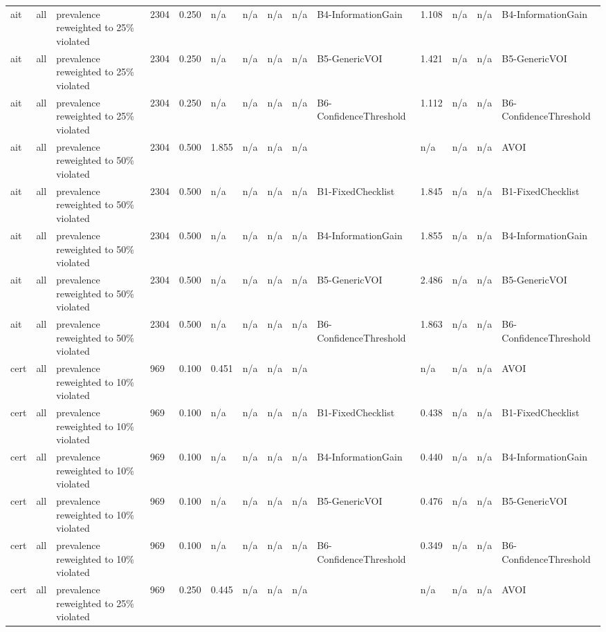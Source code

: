 \begin{table}[!ht]
{\begin{tabular}{llllllllllllll}
ait & all & prevalence reweighted to 25\% violated & 2304 & 0.250 & n/a & n/a & n/a & n/a & B4-InformationGain & 1.108 & n/a & n/a & B4-InformationGain \\
ait & all & prevalence reweighted to 25\% violated & 2304 & 0.250 & n/a & n/a & n/a & n/a & B5-GenericVOI & 1.421 & n/a & n/a & B5-GenericVOI \\
ait & all & prevalence reweighted to 25\% violated & 2304 & 0.250 & n/a & n/a & n/a & n/a & B6-ConfidenceThreshold & 1.112 & n/a & n/a & B6-ConfidenceThreshold \\
ait & all & prevalence reweighted to 50\% violated & 2304 & 0.500 & 1.855 & n/a & n/a & n/a &  & n/a & n/a & n/a & AVOI \\
ait & all & prevalence reweighted to 50\% violated & 2304 & 0.500 & n/a & n/a & n/a & n/a & B1-FixedChecklist & 1.845 & n/a & n/a & B1-FixedChecklist \\
ait & all & prevalence reweighted to 50\% violated & 2304 & 0.500 & n/a & n/a & n/a & n/a & B4-InformationGain & 1.855 & n/a & n/a & B4-InformationGain \\
ait & all & prevalence reweighted to 50\% violated & 2304 & 0.500 & n/a & n/a & n/a & n/a & B5-GenericVOI & 2.486 & n/a & n/a & B5-GenericVOI \\
ait & all & prevalence reweighted to 50\% violated & 2304 & 0.500 & n/a & n/a & n/a & n/a & B6-ConfidenceThreshold & 1.863 & n/a & n/a & B6-ConfidenceThreshold \\
cert & all & prevalence reweighted to 10\% violated & 969 & 0.100 & 0.451 & n/a & n/a & n/a &  & n/a & n/a & n/a & AVOI \\
cert & all & prevalence reweighted to 10\% violated & 969 & 0.100 & n/a & n/a & n/a & n/a & B1-FixedChecklist & 0.438 & n/a & n/a & B1-FixedChecklist \\
cert & all & prevalence reweighted to 10\% violated & 969 & 0.100 & n/a & n/a & n/a & n/a & B4-InformationGain & 0.440 & n/a & n/a & B4-InformationGain \\
cert & all & prevalence reweighted to 10\% violated & 969 & 0.100 & n/a & n/a & n/a & n/a & B5-GenericVOI & 0.476 & n/a & n/a & B5-GenericVOI \\
cert & all & prevalence reweighted to 10\% violated & 969 & 0.100 & n/a & n/a & n/a & n/a & B6-ConfidenceThreshold & 0.349 & n/a & n/a & B6-ConfidenceThreshold \\
cert & all & prevalence reweighted to 25\% violated & 969 & 0.250 & 0.445 & n/a & n/a & n/a &  & n/a & n/a & n/a & AVOI \\

\end{tabular}}
\end{table}
